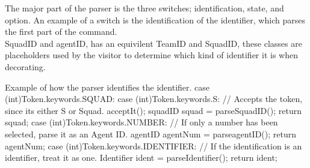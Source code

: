 The major part of the parser is the three switches; identification, state, and option. An example of a switch is the identification of the identifier, which parses the first part of the command.\\
SquadID and agentID, has an equivilent TeamID and SquadID, these classes are placeholders used by the visitor to determine which kind of identifier it is when decorating.

\begin{source}{Example of how the parser identifies the identifier.}{}
case (int)Token.keywords.SQUAD:
case (int)Token.keywords.S:
	// Accepts the token, since its either S or Squad.
   	acceptIt();
    squadID squad = parseSquadID();
    return squad;
case (int)Token.keywords.NUMBER:
	// If only a number has been selected, parse it as an Agent ID.
	agentID agentNum = parseagentID();
    return agentNum;
case (int)Token.keywords.IDENTIFIER:
    // If the identification is an identifier, treat it as one.
    Identifier ident = parseIdentifier();
	return ident;
\end{source}